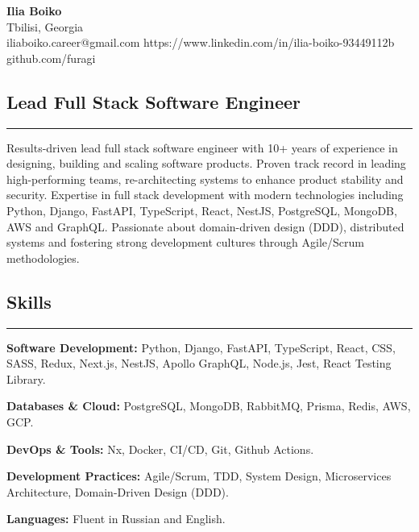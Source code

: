 \documentclass[11pt,letterpaper]{article}
\begin{document}
\begin{center}
	{\LARGE \textbf{Ilia Boiko}}
	\\ Tbilisi, Georgia
	\vspace{0.05cm}
	\\
	\raisebox{-0.2\height}{\Large \faEnvelopeSquare} iliaboiko.career@gmail.com \hfill \raisebox{-0.2\height}{\Large \faLinkedin} https://www.linkedin.com/in/ilia-boiko-93449112b \hfill \raisebox{-0.2\height}{\Large \faGithubSquare} github.com/furagi \hfill 
\end{center}

\subsection*{\Large Lead Full Stack Software Engineer}
\vspace{-.5em}
\hrule
\vspace{1em}
Results-driven lead full stack software engineer with 10+ years of experience in designing, building and scaling software products. Proven track record in leading high-performing teams, re-architecting systems to enhance product stability and security. Expertise in full stack development with modern technologies including Python, Django, FastAPI, TypeScript, React, NestJS, PostgreSQL, MongoDB, AWS and GraphQL. Passionate about domain-driven design (DDD), distributed systems and fostering strong development cultures through Agile/Scrum methodologies.

\subsection*{\Large Skills}
\vspace{-.5em}
\hrule
\vspace{1em}
\begin{itemize*}
	\item {\textbf{Software Development:}} Python, Django, FastAPI, TypeScript, React, CSS, SASS, Redux, Next.js, NestJS, Apollo GraphQL,  Node.js, Jest, React Testing Library.
	\item {\textbf{Databases \& Cloud:}} PostgreSQL, MongoDB, RabbitMQ, Prisma, Redis, AWS, GCP.
	\item {\textbf{DevOps \& Tools:}} Nx, Docker, CI/CD, Git, Github Actions.
	\item {\textbf{Development Practices:}} Agile/Scrum, TDD, System Design, Microservices Architecture, Domain-Driven Design (DDD).
	\item {\textbf{Languages:}} Fluent in Russian and English.
\end{itemize*}
\end{document}

